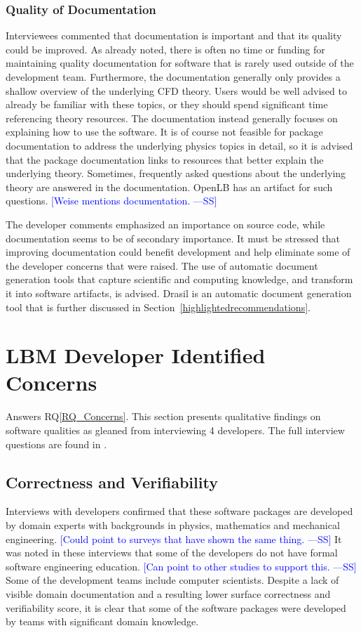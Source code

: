 \documentclass[final, 3p, times, authoryear]{elsarticle}
\newcommand{\authornote}[3]{\textcolor{#1}{[#3 ---#2]}}
\newcommand{\authornote}[3]{}
\newcommand{\wss}[1]{\authornote{blue}{SS}{#1}} %
\newcommand{\rqref}[1]{RQ\ref{#1}}
\begin{document}
\subsubsection{Quality of Documentation}

Interviewees commented that documentation is important and that its quality
could be improved. As already noted, there is often no time or funding for
maintaining quality documentation for software that is rarely used outside of
the development team. Furthermore, the documentation generally only provides a
shallow overview of the underlying CFD theory. Users would be well advised to
already be familiar with these topics, or they should spend significant time
referencing theory resources. The documentation instead generally focuses on
explaining how to use the software. It is of course not feasible for package
documentation to address the underlying physics topics in detail, so it is
advised that the package documentation links to resources that better explain
the underlying theory. Sometimes, frequently asked questions about the
underlying theory are answered in the documentation. OpenLB has an artifact for
such questions.  \wss{Weise mentions documentation.}

The developer comments emphasized an importance on source code, while
documentation seems to be of secondary importance. It must be stressed that
improving documentation could benefit development and help eliminate some of the
developer concerns that were raised. The use of automatic document generation
tools that capture scientific and computing knowledge, and transform it into
software artifacts, is advised. Drasil is an automatic document generation tool
that is further discussed in Section~\ref{highlightedrecommendations}.

\section{LBM Developer Identified Concerns} \label{Sec_Concerns}

Answers \rqref{RQ_Concerns}.  This section presents qualitative findings on
software qualities as gleaned from interviewing 4 developers. The full interview
questions are found in \citet{SmithEtAl2021}.

\subsection{Correctness and Verifiability}

Interviews with developers confirmed that these software packages are developed
by domain experts with backgrounds in physics, mathematics and mechanical
engineering. \wss{Could point to surveys that have shown the same thing.}  It
was noted in these interviews that some of the developers do not have formal
software engineering education. \wss{Can point to other studies to support
this.} Some of the development teams include computer scientists. Despite a lack
of visible domain documentation and a resulting lower surface correctness and
verifiability score, it is clear that some of the software packages were
developed by teams with significant domain knowledge. 
\end{document}
